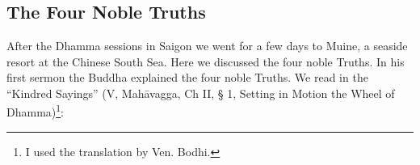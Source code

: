\chapter[The Four Noble Truths]{}
\section*{The Four Noble Truths}



After the Dhamma sessions in Saigon we went for a few days to Muine, a
seaside resort at the Chinese South Sea. Here we discussed the four
noble Truths. In his first sermon the Buddha explained the four noble
Truths. We read in the ``Kindred Sayings'' (V, Mahāvagga, Ch II, § 1,
Setting in Motion the Wheel of
Dhamma)\footnote{I used the translation
by Ven. Bodhi.}:

